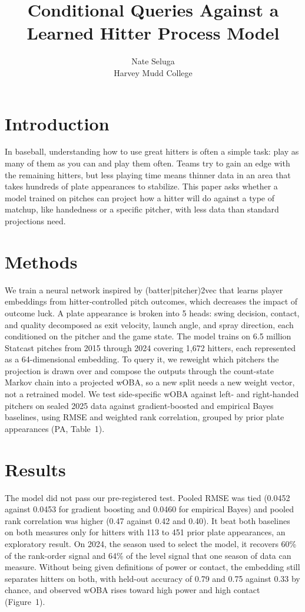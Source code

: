 \documentclass[11pt]{article}
\title{Conditional Queries Against a Learned Hitter Process Model}
\author{Nate Seluga\\ Harvey Mudd College}
\date{}
\begin{document}
\maketitle
\vspace{-2em}

\section{Introduction}
In baseball, understanding how to use great hitters is often a simple task: play as many of them as you can and play them often. Teams try to gain an edge with the remaining hitters, but less playing time means thinner data in an area that takes hundreds of plate appearances to stabilize. This paper asks whether a model trained on pitches can project how a hitter will do against a type of matchup, like handedness or a specific pitcher, with less data than standard projections need.

\section{Methods}
We train a neural network inspired by (batter$|$pitcher)2vec that learns player embeddings from hitter-controlled pitch outcomes, which decreases the impact of outcome luck. A plate appearance is broken into 5 heads: swing decision, contact, and quality decomposed as exit velocity, launch angle, and spray direction, each conditioned on the pitcher and the game state. The model trains on 6.5 million Statcast pitches from 2015 through 2024 covering 1,672 hitters, each represented as a 64-dimensional embedding. To query it, we reweight which pitchers the projection is drawn over and compose the outputs through the count-state Markov chain into a projected wOBA, so a new split needs a new weight vector, not a retrained model. We test side-specific wOBA against left- and right-handed pitchers on sealed 2025 data against gradient-boosted and empirical Bayes baselines, using RMSE and weighted rank correlation, grouped by prior plate appearances (PA, Table~1).

\section{Results}
The model did not pass our pre-registered test. Pooled RMSE was tied (0.0452 against 0.0453 for gradient boosting and 0.0460 for empirical Bayes) and pooled rank correlation was higher (0.47 against 0.42 and 0.40). It beat both baselines on both measures only for hitters with 113 to 451 prior plate appearances, an exploratory result. On 2024, the season used to select the model, it recovers 60\% of the rank-order signal and 64\% of the level signal that one season of data can measure. Without being given definitions of power or contact, the embedding still separates hitters on both, with held-out accuracy of 0.79 and 0.75 against 0.33 by chance, and observed wOBA rises toward high power and high contact (Figure~1).
\end{document}
